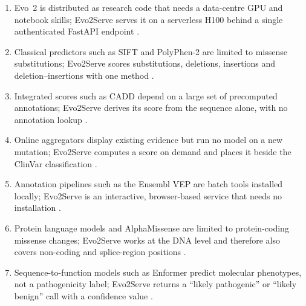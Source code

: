 \vspace{6pt}
\vspace{6pt}
\begin{enumerate}
\setlength{\itemsep}{12pt}
\item Evo~2 is distributed as research code that needs a data-centre GPU and notebook skills; Evo2Serve serves it on a serverless H100 behind a single authenticated FastAPI endpoint \cite{brixi2026evo2,brixi2025stripedhyena2}.
\item Classical predictors such as SIFT and PolyPhen-2 are limited to missense substitutions; Evo2Serve scores substitutions, deletions, insertions and deletion--insertions with one method \cite{ng2001sift,adzhubei2010polyphen2}.
\item Integrated scores such as CADD depend on a large set of precomputed annotations; Evo2Serve derives its score from the sequence alone, with no annotation lookup \cite{rentzsch2019cadd,schubach2024cadd}.
\item Online aggregators display existing evidence but run no model on a new mutation; Evo2Serve computes a score on demand and places it beside the ClinVar classification \cite{vandenbroucke2019varsome,baux2021mobidetails}.
\item Annotation pipelines such as the Ensembl VEP are batch tools installed locally; Evo2Serve is an interactive, browser-based service that needs no installation \cite{mclaren2016vep}.
\item Protein language models and AlphaMissense are limited to protein-coding missense changes; Evo2Serve works at the DNA level and therefore also covers non-coding and splice-region positions \cite{cheng2023alphamissense,lin2023esm2}.
\item Sequence-to-function models such as Enformer predict molecular phenotypes, not a pathogenicity label; Evo2Serve returns a ``likely pathogenic'' or ``likely benign'' call with a confidence value \cite{avsec2021enformer}.
\end{enumerate}

